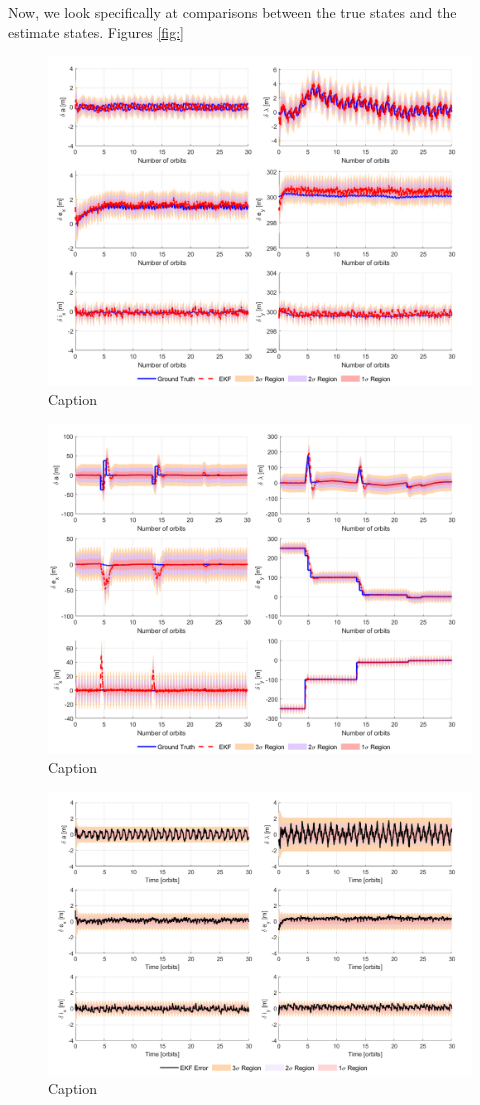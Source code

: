 Now, we look specifically at comparisons between the true states and the estimate states. Figures \ref{fig:}
\begin{figure}[H]
    \centering
    \includegraphics[width=0.7\linewidth]{sim/figures/PS9/ROE_over_time_SV2_comparison.png}
    \caption{Caption}
    \label{fig:enter-label}
\end{figure}


\begin{figure}[H]
    \centering
    \includegraphics[width=0.7\linewidth]{sim/figures/PS9/ROE_over_time_SV3_comparison.png}
    \caption{Caption}
    \label{fig:enter-label}
\end{figure}

\begin{figure}[H]
    \centering
    \includegraphics[width=0.7\linewidth]{sim/figures/PS9/EKF_error_SV2.png}
    \caption{Caption}
    \label{fig:enter-label}
\end{figure}


